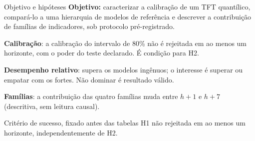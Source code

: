 \documentclass[aspectratio=169,10pt]{beamer}
\newcommand{\hum}{\(h{+}1\)}
\newcommand{\hsete}{\(h{+}7\)}
\begin{document}
\begin{frame}{Objetivo e hipóteses}
  \textbf{Objetivo:} caracterizar a calibração de um TFT quantílico, compará-lo a uma
  hierarquia de modelos de referência e descrever a contribuição de famílias de
  indicadores, sob protocolo pré-registrado.

  \vspace{6pt}
  \begin{description}[H3]
    \item[H1] \textbf{Calibração}: a calibração do intervalo de 80\% não é rejeitada
      em ao menos um horizonte, com o poder do teste declarado. É condição para H2.
    \item[H2] \textbf{Desempenho relativo}: supera os modelos ingênuos; o interesse é
      superar ou empatar com os fortes. Não dominar é resultado válido.
    \item[H3] \textbf{Famílias}: a contribuição das quatro famílias muda entre
      \hum{} e \hsete{} (descritiva, sem leitura causal).
  \end{description}
  \vspace{4pt}
  \begin{block}{Critério de sucesso, fixado antes das tabelas}
    H1 não rejeitada em ao menos um horizonte, independentemente de H2.
  \end{block}
\end{frame}
\end{document}
